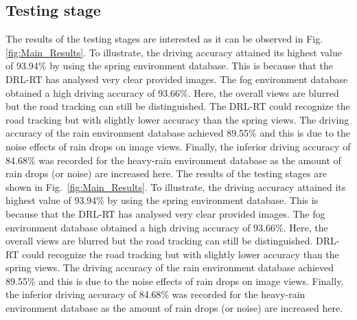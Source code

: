 \documentclass{svproc}
\begin{document}
	\subsection{Testing stage} 
	The results of the testing stages are interested as it can be observed in Fig. \ref{fig:Main_Results}. To illustrate, the driving accuracy attained its highest value of 93.94\% by using the spring environment database. This is because that the DRL-RT has analysed very clear provided images.  The fog environment database obtained a high driving accuracy of 93.66\%. Here, the overall views are blurred but the road tracking can still be distinguished. The DRL-RT could recognize the road tracking but with slightly lower accuracy than the spring views. The driving accuracy of the rain environment database achieved 89.55\% and this is due to the noise effects of rain drops on image views. Finally, the inferior driving accuracy of 84.68\% was recorded for the heavy-rain environment database as the amount of rain drops (or noise) are increased here.
	The results of the testing stages are %
	shown in Fig.~\ref{fig:Main_Results}. To illustrate, the driving accuracy attained its highest value of 93.94\% by using the spring environment database. This is because that the DRL-RT has analysed very clear provided images.  The fog environment database obtained a high driving accuracy of 93.66\%. Here, the overall views are blurred but the road tracking can still be distinguished. DRL-RT could recognize the road tracking but with slightly lower accuracy than the spring views. The driving accuracy of the rain environment database achieved 89.55\% and this is due to the noise effects of rain drops on image views. Finally, the inferior driving accuracy of 84.68\% was recorded for the heavy-rain environment database as the amount of rain drops (or noise) are increased here.
\end{document}

